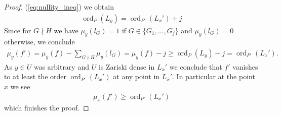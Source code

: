 \documentclass[a4paper,10pt]{amsart}
\theoremstyle{definition}
\theoremstyle{plain}
\newcommand{\ord}{\operatorname{ord}}
\begin{document}
\begin{proof}
        (\ref{eq:nullity_ineq}) we obtain \begin{align}
               \label{eq:order_ineq_y}
               \ord_P(L_y)=\ord_{P'}(L_x')+j 
        \end{align}
 Since for $G\nmid H$ we have $\mu_y(l_G)=1$ if $G\in \{G_1,\ldots,G_j\}$ and $\mu_y(l_G)=0$ otherwise, we conclude \begin{align*}
     \mu_y(f')=\mu_y(f)-\sum_{G\nmid H}\mu_y(l_G)= \mu_y(f)-j\geq \ord_{P}(L_y)-j= \ord_{P'}(L_x').
 \end{align*}
  As $y\in U$ was arbitrary and $U$ is Zariski dense in $L_x'$ we conclude that $f'$ vanishes to at least the order $\ord_{P'}(L_x')$ at any point in $L_x'$. In particular at the point $x$ we see \begin{align*}
     \mu_x(f')\geq \ord_{P'}(L_x')
 \end{align*}
 which finishes the proof.
\end{proof}
\end{document}
